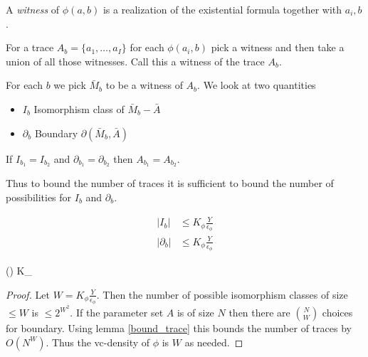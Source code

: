 \documentclass{amsart}
\begin{document}
\begin{Definition}
	A \emph{witness} of $\phi(a, b)$ is a realization of the existential formula together with ${a_i, b}$.
\end{Definition}

\begin{Definition}
	For a trace $A_b = \{a_1, \ldots, a_I\}$ for each $\phi(a_i, b)$ pick a witness and then take a union of all those witnesses. Call this a witness of the trace $A_b$.	%
\end{Definition}

For each $b$ we pick $\bar M_b$ to be a witness of $A_b$. We look at two quantities
\begin{itemize}
	\item $I_b$ Isomorphism class of $\bar M_b - \bar A$
	\item $\partial_b$ Boundary $\partial(\bar M_b, \bar A)$
\end{itemize}

\begin{Lemma} \label {bound_trace}
	If $I_{b_1} = I_{b_2}$ and $\partial_{b_1} = \partial_{b_2}$ then $A_{b_1} = A_{b_2}$.
\end{Lemma}

Thus to bound the number of traces it is sufficient to bound the number of possibilities for $I_b$ and $\partial_b$.

\begin{Theorem} \label{main_bound}
	\begin{align*}
		|I_b| &\leq K_\phi \frac{Y}{\epsilon_\phi}\\
		|\partial_b| &\leq K_\phi \frac{Y}{\epsilon_\phi}
	\end{align*}
\end{Theorem}

\begin{Corollary}
	\vc(\phi) \leq K_\phi {}
\end{Corollary}

\begin{proof}
		Let $W = K_\phi \frac{Y}{\epsilon_\phi}$.
		Then the number of possible isomorphism classes of size $\leq W$ is $\leq 2^{W^2}$.
		If the parameter set $A$ is of size $N$ then there are $N \choose W$ choices for boundary.
		Using lemma \ref{bound_trace} this bounds the number of traces by $O(N^W)$.
		Thus the vc-density of $\phi$ is $W$ as needed.
\end{proof}
\end{document}
